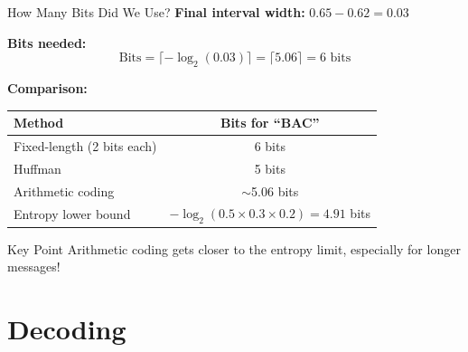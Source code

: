 \documentclass[aspectratio=169,12pt]{beamer}
\begin{document}
\begin{frame}{How Many Bits Did We Use?}
    \textbf{Final interval width:} $0.65 - 0.62 = 0.03$
    
    \vspace{0.3cm}
    \textbf{Bits needed:}
    \begin{equation*}
        \text{Bits} = \lceil -\log_2(0.03) \rceil = \lceil 5.06 \rceil = 6 \text{ bits}
    \end{equation*}
    
    \vspace{0.3cm}
    \textbf{Comparison:}
    \begin{center}
        \begin{tabular}{l|c}
            \toprule
            Method & Bits for ``BAC'' \\
            \midrule
            Fixed-length (2 bits each) & 6 bits \\
            Huffman & 5 bits \\
            Arithmetic coding & $\sim$5.06 bits \\
            Entropy lower bound & $-\log_2(0.5 \times 0.3 \times 0.2) = 4.91$ bits \\
            \bottomrule
        \end{tabular}
    \end{center}
    
    \vspace{0.3cm}
    \begin{block}{Key Point}
        Arithmetic coding gets closer to the entropy limit, especially for longer messages!
    \end{block}
\end{frame}

\section{Decoding}
\end{document}
